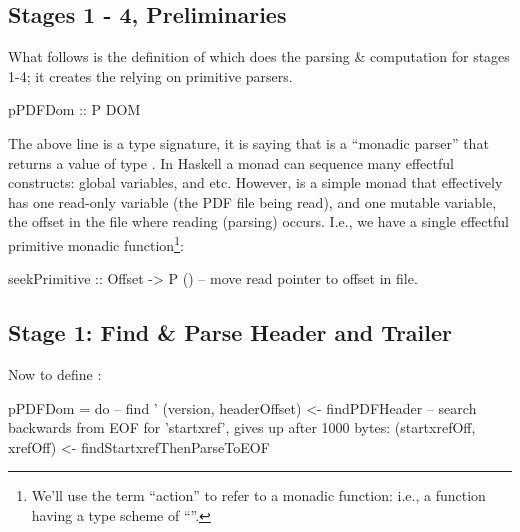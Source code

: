 
\subsection{Stages 1 - 4, Preliminaries}

\iffalse
\begin{code}
{-# LANGUAGE EmptyDataDecls, TypeOperators, LambdaCase #-}
module Spec where
import           Control.Monad
import           Data.Char
import           Data.Foldable(foldlM)
import qualified Data.Map as M
import           Data.Map(Map)
import           Types
import           Utils
import           Primitives
\end{code}
\fi

What follows is the definition of  which does the
parsing \& computation for stages 1-4;
it creates the  relying on primitive parsers.
\begin{code}
pPDFDom :: P DOM
\end{code}
The above line is a type signature, it is saying that
 is a ``monadic parser''  that returns a
value of type .
In Haskell a monad can sequence many effectful constructs: global variables,
and etc. However,  is a simple monad that effectively has one
read-only variable (the PDF file being read), and one mutable variable,
the offset in the file where reading (parsing) occurs.  I.e., we have
a single effectful primitive monadic function\footnote{
  We'll use the term ``action'' to refer to a monadic function:
  i.e., a function having a type scheme of ``''.
}:
\begin{codeNoExecute}
seekPrimitive :: Offset -> P () -- move read pointer to offset in file.
\end{codeNoExecute}

\subsection{Stage 1: Find \& Parse Header and Trailer}

Now to define :
\begin{code}
pPDFDom =
    do
    -- find '%
    (version, headerOffset) <- findPDFHeader
    -- search backwards from EOF for 'startxref', gives up after 1000 bytes:
    (startxrefOff, xrefOff) <- findStartxrefThenParseToEOF
\end{code}

